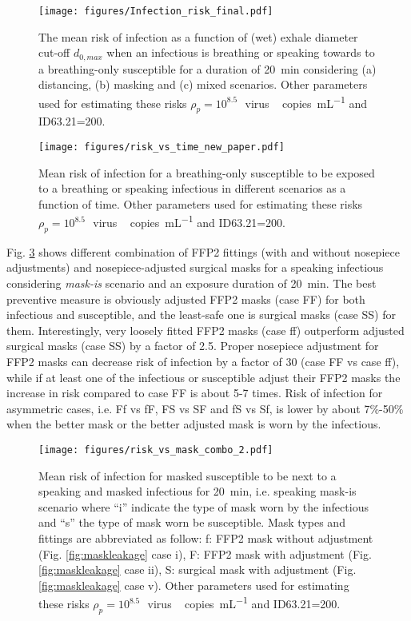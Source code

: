 \documentclass[preprint]{elsarticle}
\begin{document}
\begin{figure}[!htbp]
	\centering
	\texttt{[image: figures/Infection\_risk\_final.pdf]}
	\caption{The mean risk of infection as a function of (wet) exhale diameter cut-off $d_{0, max}$ when an infectious is breathing or speaking towards to a breathing-only susceptible for a duration of \SI{20}{\minute} considering (a) distancing, (b) masking and (c) mixed scenarios. Other parameters used for estimating these risks $\rho_p=10^{8.5}\,$\SI{}{virus\,copies\per\milli\liter} and  ID63.21=200.}
	\label{fig:infection_risk_20min}
\end{figure}

\begin{figure}[!htbp]
	\centering
	\texttt{[image: figures/risk\_vs\_time\_new\_paper.pdf]}
	\caption{ Mean risk of infection for a breathing-only susceptible to be exposed to a breathing or speaking infectious in different scenarios as a function of time. Other parameters used for estimating these risks $\rho_p=10^{8.5}\,$\SI{}{virus\,copies\per\milli\liter} and  ID63.21=200.}
	\label{fig:infection_risk_time}
\end{figure}


Fig. \ref{fig:infection_risk_mask_combo} shows different combination of FFP2 fittings (with and without nosepiece adjustments) and nosepiece-adjusted surgical masks for a speaking infectious considering \emph{mask-is} scenario and an exposure duration of \SI{20}{\minute}. 
The best preventive measure is obviously adjusted FFP2 masks (case FF) for both infectious and susceptible, and the least-safe one is surgical masks (case SS) for them. 
Interestingly, very loosely fitted FFP2 masks (case ff) outperform adjusted surgical masks (case SS) by a factor of 2.5.
Proper nosepiece adjustment for FFP2 masks can decrease risk of infection by a factor of 30 (case FF vs case ff), while if at least one of the infectious or susceptible adjust their FFP2 masks the increase in risk compared to case FF is about 5-7 times. 
Risk of infection for asymmetric cases, i.e. Ff vs fF, FS vs SF and fS vs Sf, is lower by about 7\%-50\% when the better mask or the better adjusted mask is worn by the infectious. 

\begin{figure}[!htbp]
	\centering
	\texttt{[image: figures/risk\_vs\_mask\_combo\_2.pdf]}
	\caption{Mean risk of infection for masked susceptible to be next to a speaking and masked infectious for \SI{20}{\minute}, i.e. speaking mask-is scenario where \enquote{i} indicate the type of mask worn by the infectious and \enquote{s} the type of mask worn be susceptible. Mask types and fittings are abbreviated as follow: f: FFP2 mask without adjustment (Fig. \ref{fig:maskleakage} case i), F: FFP2 mask with adjustment (Fig. \ref{fig:maskleakage} case ii), S:  surgical mask with adjustment (Fig. \ref{fig:maskleakage} case v). Other parameters used for estimating these risks $\rho_p=10^{8.5}\,$\SI{}{virus\,copies\per\milli\liter} and  ID63.21=200.}
	\label{fig:infection_risk_mask_combo}
\end{figure}
\end{document}
